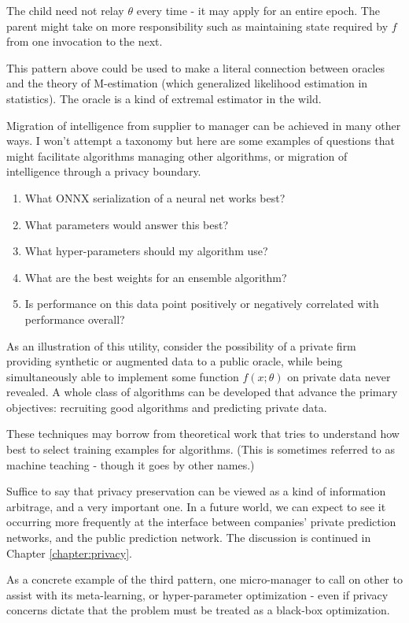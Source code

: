 The child need not relay $\theta$ every time - it may apply for an entire epoch. The parent might take on more responsibility such as maintaining state required by $f$ from one invocation to the next. 

This pattern above could be used to make a literal connection between oracles and the theory of M-estimation (which generalized likelihood estimation in statistics). The oracle is a kind of extremal estimator in the wild. 

Migration of intelligence from supplier to manager can be achieved in many other ways. I won't attempt a taxonomy but here are some examples of questions that might facilitate algorithms managing other algorithms, or migration of intelligence through a privacy boundary. 

\begin{enumerate}
\item What ONNX serialization of a neural net works best? 
\item What parameters would answer this best? 
\item What hyper-parameters should my algorithm use? 
\item What are the best weights for an ensemble algorithm? 
\item Is performance on this data point positively or negatively correlated with performance overall?
\end{enumerate}

As an illustration of this utility, consider the possibility of a private firm providing synthetic or augmented data to a public oracle, while being simultaneously able to implement some function $f(x;\theta)$ on private data never revealed. A whole class of algorithms can be developed that advance the primary objectives: recruiting good algorithms and predicting private data. 

These techniques may borrow from theoretical work that tries to understand how best to select training examples for algorithms. (This is sometimes referred to as machine teaching - though it goes by other names.) 

Suffice to say that privacy preservation can be viewed as a kind of information arbitrage, and a very important one. In a future world, we can expect to see it occurring more frequently at the interface between companies' private prediction networks, and the public prediction network. The discussion is continued in Chapter \ref{chapter:privacy}. 

As a concrete example of the third pattern, one micro-manager to call on other to assist with its meta-learning, or hyper-parameter optimization - even if privacy concerns dictate that the problem must be treated as a black-box optimization. 

